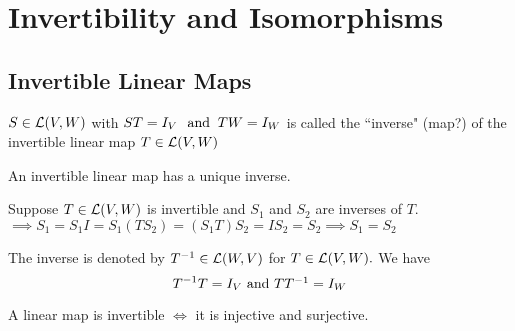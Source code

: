 \section{Invertibility and Isomorphisms}

\subsection{Invertible Linear Maps}
  \setcounter{thm}{58}
  \begin{mydef} 
    $S\in {\mathcal{L}(V,W)}$ with $ST=I_V \;\;\, \text{and}\;\; TW = I_W$ is called the ``inverse" (map?) of the invertible linear map $T \in {\mathcal{L}(V,W)}$
  \end{mydef}

  \begin{thm} 
    An invertible  linear map has a unique inverse.
  \end{thm}
  \begin{prf}
    Suppose $T\in {\mathcal{L}(V,W)}$ is invertible and $S_1$ and $S_2$ are inverses of $T$. $\implies S_1 = S_1 I = S_1 (T S_2) = (S_1 T) S_2 = I S_2 = S_2 \implies S_1 = S_2$ 
  \end{prf}

  \begin{mydef} [notation $T^{-1}$]
    The inverse is denoted by $T^{-1}\in \mathcal{L}(W,V)$ for $T\in \mathcal{L}(V,W).$ We have
    \begin{equation}
      T^{-1}T=I_V$ and $T T^{-1} = I_W
    \end{equation}
  \end{mydef}

  \begin{thm} 
    A linear map is invertible $\iff$ it is injective and surjective.
  \end{thm}

